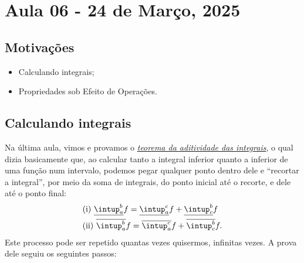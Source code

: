 \documentclass[../analysisII_notes.tex]{subfiles}
\begin{document}
\section{Aula 06 - 24 de Março, 2025}
\subsection{Motivações}
\begin{itemize}
	\item Calculando integrais;
	\item Propriedades sob Efeito de Operações.
\end{itemize}
\subsection{Calculando integrais}
Na última aula, vimos e provamos o \hyperlink{integral_additivity}{\textit{teorema da aditividade das integrais}}, o qual dizia basicamente que, ao calcular tanto a integral inferior quanto a inferior de uma função num intervalo, podemos pegar qualquer ponto dentro dele e ``recortar a integral'', por meio da soma de integrais, do ponto inicial até o recorte, e dele até o ponto final:
\begin{align*}
	 & \text{(i) } \underline{\intup_{a}^{b}}f = \underline{\intup_{a}^{c}}f + \underline{\intup_{c}^{b}}f \\
	 & \text{(ii) } \overline{\intup_{a}^{b}}f = \overline{\intup_{a}^{c}}f + \overline{\intup_{c}^{b}}f.
\end{align*}
Este processo pode ser repetido quantas vezes quisermos, infinitas vezes. A prova dele seguiu os seguintes passos:
\end{document}
